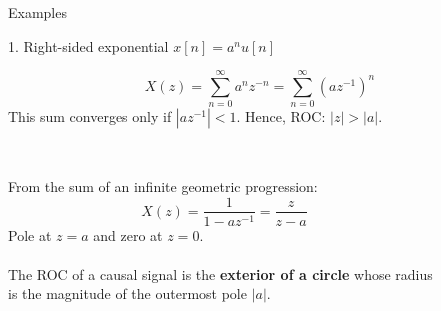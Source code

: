 \documentclass[10pt]{beamer}
\begin{document}
%
\begin{frame}{Examples}

\begin{block}{1. Right-sided exponential $x[n] = a^nu[n]$}

\begin{equation*} 
X(z) = \sum_{n=0}^\infty a^nz^{-n} = \sum_{n=0}^\infty (az^{-1})^n 
\end{equation*}
This sum converges only if $|az^{-1}| < 1$. Hence, ROC: $|z| > |a|$.
~\\
~\\
\begin{columns}
	\begin{column}{0.5\textwidth}
		From the sum of an infinite geometric progression:
		\begin{equation*} 
		X(z) = \frac{1}{1-az^{-1}} = \frac{z}{z-a}
		\end{equation*}
		Pole at $z = a$ and zero at $z = 0$.
		~\\
		~\\
		The ROC of a causal signal is the \textbf{exterior of a circle} whose radius is the magnitude of the outermost pole $|a|$.
	\end{column}
	\begin{column}{0.5\textwidth}  %
		\begin{figure}
			\centering
			\resizebox{0.95\linewidth}{!}{}
			\label{fig:right_sided_exp}
		\end{figure}
	\end{column}
\end{columns}

\end{block}
\end{frame}
\end{document}
